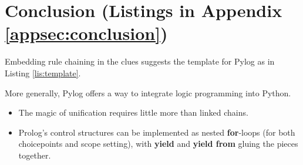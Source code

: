 \section{Conclusion (Listings in Appendix \ref{appsec:conclusion})} \label{sec:conclusion}

Embedding rule chaining in the clues suggests the template for Pylog as in Listing \ref{lis:template}.


More generally, Pylog offers a way to integrate logic programming into Python.

\begin{itemize}
  \item The magic of unification requires little more than linked chains.
  \item Prolog's control structures can be implemented as nested \textbf{for}-loops (for both choicepoints and scope setting), with \textbf{yield} and \textbf{yield from} gluing the pieces together.
\end{itemize}






